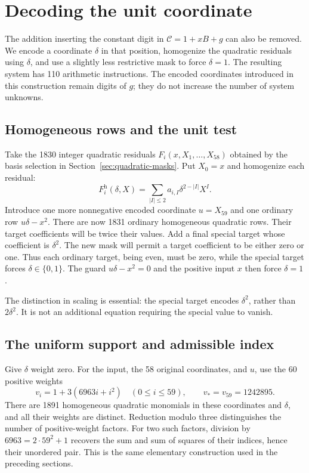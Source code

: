 \section{Decoding the unit coordinate}\label{sec:unit-digit}

The addition inserting the constant digit in
$\mathcal C=1+xB+g$ can also be removed. We encode a coordinate
$\delta$ in that position, homogenize the quadratic residuals using
$\delta$, and use a slightly less restrictive mask to force
$\delta=1$. The resulting system has 110 arithmetic instructions.
The encoded coordinates introduced in this construction remain digits
of $g$; they do not increase the number of system unknowns.

\subsection{Homogeneous rows and the unit test}

Take the 1830 integer quadratic residuals $F_i(x,X_1,\ldots,X_{58})$
obtained by the basis selection in Section~\ref{sec:quadratic-masks}.
Put $X_0=x$ and homogenize each residual:
\[
 F_i^{\mathrm h}(\delta,X)
   =\sum_{|I|\le2}a_{i,I}\delta^{2-|I|}X^I.
\]
Introduce one more nonnegative encoded coordinate $u=X_{59}$ and
one ordinary row $u\delta-x^2$. There are now 1831 ordinary homogeneous
quadratic rows. Their target coefficients will be twice their values.
Add a final special target whose coefficient is $\delta^2$.
The new mask will permit a target coefficient to be either zero or one.
Thus each ordinary target, being even, must be zero, while the special
target forces $\delta\in\{0,1\}$. The guard $u\delta-x^2=0$ and the
positive input $x$ then force $\delta=1$.

The distinction in scaling is essential: the special target encodes
$\delta^2$, rather than $2\delta^2$. It is not an additional equation
requiring the special value to vanish.

\subsection{The uniform support and admissible index}

Give $\delta$ weight zero. For the input, the 58 original coordinates,
and $u$, use the 60 positive weights
\[
 v_i=1+3(6963i+i^2)\quad(0\le i\le59),
 \qquad v_*=v_{59}=1242895.
\]
There are 1891 homogeneous quadratic monomials in these coordinates
and $\delta$, and all their weights are distinct. Reduction modulo
three distinguishes the number of positive-weight factors. For two
such factors, division by $6963=2\cdot59^2+1$ recovers the sum and
sum of squares of their indices, hence their unordered pair. This is
the same elementary construction used in the preceding sections.

